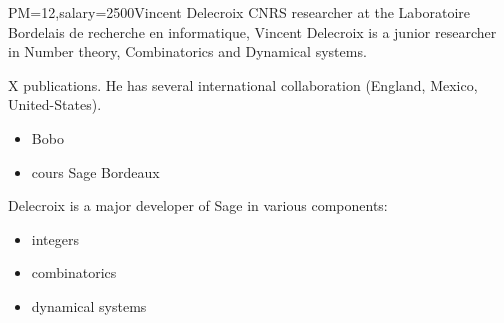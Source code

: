 \begin{picv}{PM=12,salary=2500}{Vincent Delecroix}
  CNRS researcher at the Laboratoire Bordelais de recherche en informatique, Vincent
  Delecroix is a junior researcher in Number theory, Combinatorics and Dynamical systems.

  X publications.  He has several international collaboration (England, Mexico,
  United-States).

  \begin{itemize}
\item  Bobo
\item  cours Sage Bordeaux
\end{itemize}

Delecroix is a major developer of Sage in various components:
\begin{itemize}
\item  integers
\item  combinatorics
\item dynamical systems
\end{itemize}
\end{picv}

